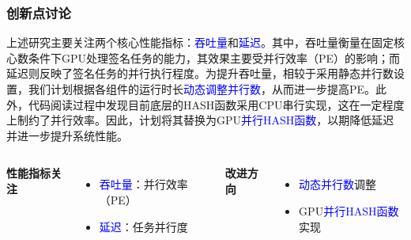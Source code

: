 \documentclass[slide]{../../custom}
\begin{document}
\begin{frame}
  \frametitle{创新点讨论}
  上述研究主要关注两个核心性能指标：\textcolor{blue}{吞吐量}和\textcolor{blue}{延迟}。其中，吞吐量衡量在固定核心数条件下GPU处理签名任务的能力，其效果主要受并行效率（PE）的影响；而延迟则反映了签名任务的并行执行程度。为提升吞吐量，相较于采用静态并行数设置，我们计划根据各组件的运行时长\textcolor{blue}{动态调整并行数}，从而进一步提高PE。此外，代码阅读过程中发现目前底层的HASH函数采用CPU串行实现，这在一定程度上制约了并行效率。因此，计划将其替换为GPU\textcolor{blue}{并行HASH函数}，以期降低延迟并进一步提升系统性能。
  \vfill
  \begin{columns}
    \textbf{性能指标关注}
    \begin{itemize}
      \item \textcolor{blue}{吞吐量}：并行效率（PE）
      \item \textcolor{blue}{延迟}：任务并行度
    \end{itemize}

    \textbf{改进方向}
    \begin{itemize}
      \item \textcolor{blue}{动态并行数}调整
      \item GPU\textcolor{blue}{并行HASH函数}实现
    \end{itemize}
  \end{columns}
\end{frame}
\end{document}
